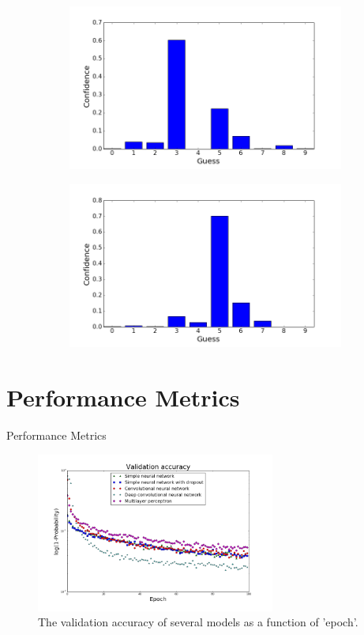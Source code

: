 \begin{frame}[plain]
\begin{figure}
\begin{subfigure}{0.45\textwidth}
\includegraphics[width = \textwidth]{wrong_guess_three}
\end{subfigure}
\begin{subfigure}{0.45\textwidth}
\includegraphics[width = \textwidth]{wrong_guess_five}
\end{subfigure}
\end{figure}
\end{frame}



\section{Performance Metrics}
\begin{frame}[plain]{Performance Metrics}
\begin{figure}
\includegraphics[width = 0.7\textwidth]{log_val_acc}
\caption{The validation accuracy of several models as a function of 'epoch'. }
\end{figure}
\end{frame}

